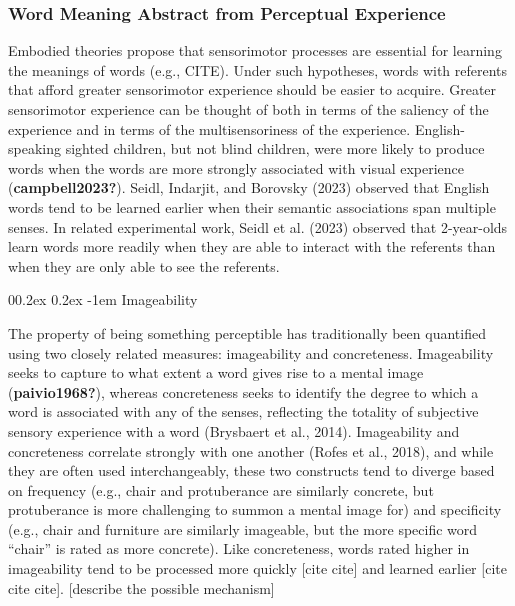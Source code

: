 \documentclass[
  man,floatsintext]{apa6}
\makeatletter
\let\oldparagraph\paragraph
\renewcommand{\paragraph}[1]{\oldparagraph{#1}\mbox{}}
\renewcommand{\paragraph}{\@startsection{paragraph}{4}{\parindent}%
  {0\baselineskip \@plus 0.2ex \@minus 0.2ex}%
  {-1em}%
  {\normalfont\normalsize\bfseries\itshape\typesectitle}}
\makeatother
\begin{document}
\hypertarget{word-meaning-abstract-from-perceptual-experience}{%
\subsubsection{Word Meaning Abstract from Perceptual Experience}\label{word-meaning-abstract-from-perceptual-experience}}

Embodied theories propose that sensorimotor processes are essential for learning the meanings of words (e.g., CITE). Under such hypotheses, words with referents that afford greater sensorimotor experience should be easier to acquire. Greater sensorimotor experience can be thought of both in terms of the saliency of the experience and in terms of the multisensoriness of the experience. English-speaking sighted children, but not blind children, were more likely to produce words when the words are more strongly associated with visual experience (\textbf{campbell2023?}). Seidl, Indarjit, and Borovsky (2023) observed that English words tend to be learned earlier when their semantic associations span multiple senses. In related experimental work, Seidl et al. (2023) observed that 2-year-olds learn words more readily when they are able to interact with the referents than when they are only able to see the referents.

\hypertarget{imageability}{%
\paragraph{Imageability}\label{imageability}}

The property of being something perceptible has traditionally been quantified using two closely related measures: imageability and concreteness. Imageability seeks to capture to what extent a word gives rise to a mental image (\textbf{paivio1968?}), whereas concreteness seeks to identify the degree to which a word is associated with any of the senses, reflecting the totality of subjective sensory experience with a word (Brysbaert et al., 2014). Imageability and concreteness correlate strongly with one another (Rofes et al., 2018), and while they are often used interchangeably, these two constructs tend to diverge based on frequency (e.g., chair and protuberance are similarly concrete, but protuberance is more challenging to summon a mental image for) and specificity (e.g., chair and furniture are similarly imageable, but the more specific word ``chair'' is rated as more concrete). Like concreteness, words rated higher in imageability tend to be processed more quickly {[}cite cite{]} and learned earlier {[}cite cite cite{]}. {[}describe the possible mechanism{]}
\end{document}
